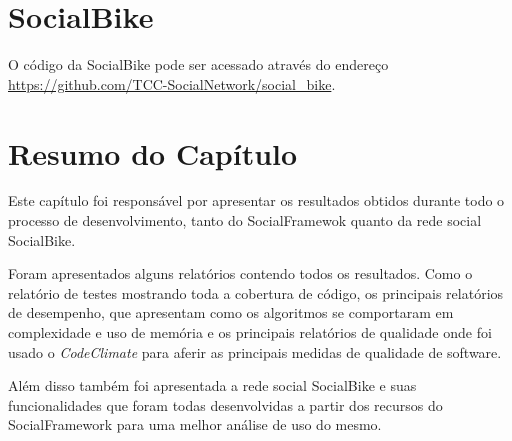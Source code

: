 \section{SocialBike}
\label{sec:SocialBike}

O código da SocialBike pode ser acessado através do endereço \url{https://github.com/TCC-SocialNetwork/social_bike}.

\section{Resumo do Capítulo}
Este capítulo foi responsável por apresentar os resultados obtidos durante todo o processo de desenvolvimento, tanto do SocialFramewok quanto da rede social SocialBike.

Foram apresentados alguns relatórios contendo todos os resultados. Como o relatório de testes mostrando toda a cobertura de código, os principais relatórios de desempenho, que apresentam como os algoritmos se comportaram em complexidade e uso de memória e os principais relatórios de qualidade onde foi usado o \textit{CodeClimate} para aferir as principais medidas de qualidade de software.

Além disso também foi apresentada a rede social SocialBike e suas funcionalidades que foram todas desenvolvidas a partir dos recursos do SocialFramework para uma melhor análise de uso do mesmo.
